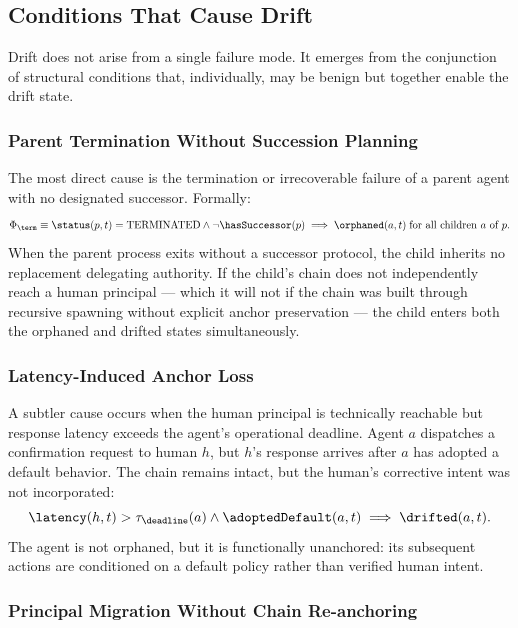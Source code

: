 \subsection{Conditions That Cause Drift}

Drift does not arise from a single failure mode. It emerges from the conjunction of structural conditions that, individually, may be benign but together enable the drift state.

\subsubsection{Parent Termination Without Succession Planning}

The most direct cause is the termination or irrecoverable failure of a parent agent with no designated successor. Formally:
\begin{equation}
\Phi_{\term} \equiv \status(p, t) = \text{TERMINATED} \land \neg \hasSuccessor(p)
\implies \orphaned(a, t) \; \text{for all children } a \text{ of } p.
\end{equation}
When the parent process exits without a successor protocol, the child inherits no replacement delegating authority. If the child's chain does not independently reach a human principal — which it will not if the chain was built through recursive spawning without explicit anchor preservation — the child enters both the orphaned and drifted states simultaneously.

\subsubsection{Latency-Induced Anchor Loss}

A subtler cause occurs when the human principal is technically reachable but response latency exceeds the agent's operational deadline. Agent $a$ dispatches a confirmation request to human $h$, but $h$'s response arrives after $a$ has adopted a default behavior. The chain remains intact, but the human's corrective intent was not incorporated:
\begin{equation}
\latency(h, t) > \tau_{\deadline}(a) \land \adoptedDefault(a, t) \implies \drifted(a, t).
\end{equation}
The agent is not orphaned, but it is functionally unanchored: its subsequent actions are conditioned on a default policy rather than verified human intent.

\subsubsection{Principal Migration Without Chain Re-anchoring}

